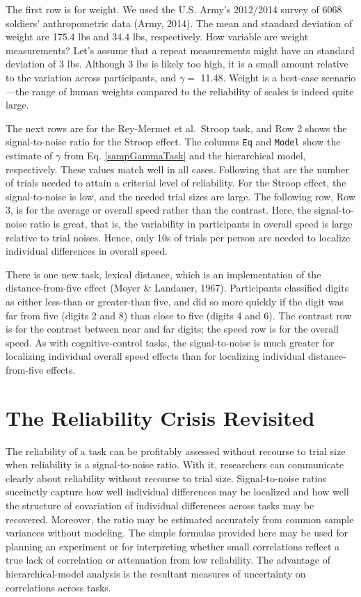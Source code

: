 \documentclass[
  ,man]{apa6}
\begin{document}
The first row is for weight. We used the U.S. Army's 2012/2014 survey of 6068 soldiers' anthropometric data (Army, 2014). The mean and standard deviation of weight are 175.4 lbs and 34.4 lbs, respectively. How variable are weight measurements? Let's assume that a repeat measurements might have an standard deviation of 3 lbs. Although 3 lbs is likely too high, it is a small amount relative to the variation across participants, and \(\gamma =\) 11.48. Weight is a best-case scenario---the range of human weights compared to the reliability of scales is indeed quite large.

The next rows are for the Rey-Mermet et al.~Stroop task, and Row 2 shows the signal-to-noise ratio for the Stroop effect. The columns \texttt{Eq} and \texttt{Model} show the estimate of \(\gamma\) from Eq. \ref{sampGammaTask} and the hierarchical model, respectively. These values match well in all cases. Following that are the number of trials needed to attain a criterial level of reliability. For the Stroop effect, the signal-to-noise is low, and the needed trial sizes are large. The following row, Row 3, is for the average or overall speed rather than the contrast. Here, the signal-to-noise ratio is great, that is, the variability in participants in overall speed is large relative to trial noises. Hence, only 10s of trials per person are needed to localize individual differences in overall speed.

There is one new task, lexical distance, which is an implementation of the distance-from-five effect (Moyer \& Landauer, 1967). Participants classified digits as either less-than or greater-than five, and did so more quickly if the digit was far from five (digits 2 and 8) than close to five (digits 4 and 6). The contrast row is for the contrast between near and far digits; the speed row is for the overall speed. As with cognitive-control tasks, the signal-to-noise is much greater for localizing individual overall speed effects than for localizing individual distance-from-five effects.

\hypertarget{the-reliability-crisis-revisited}{%
\section{The Reliability Crisis Revisited}\label{the-reliability-crisis-revisited}}

The reliability of a task can be profitably assessed without recourse to trial size when reliability is a signal-to-noise ratio. With it, researchers can communicate clearly about reliability without recourse to trial size. Signal-to-noise ratios succinctly capture how well individual differences may be localized and how well the structure of covariation of individual differences across tasks may be recovered. Moreover, the ratio may be estimated accurately from common sample variances without modeling. The simple formulas provided here may be used for planning an experiment or for interpreting whether small correlations reflect a true lack of correlation or attenuation from low reliability. The advantage of hierarchical-model analysis is the resultant measures of uncertainty on correlations across tasks.
\end{document}
